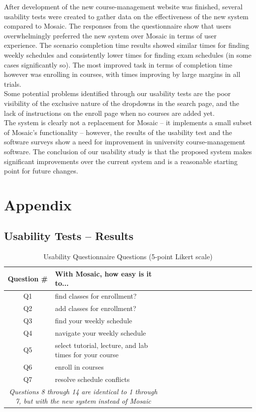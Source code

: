 \documentclass[10pt]{article}
\begin{document}
\begin{multicols}{2}
After development of the new course-management website was finished, several usability tests were created to gather data on the effectiveness of the new system compared to Mosaic. The responses from the questionnaire show that users overwhelmingly preferred the new system over Mosaic in terms of user experience. The scenario completion time results showed similar times for finding weekly schedules and consistently lower times for finding exam schedules (in some cases significantly so). The most improved task in terms of completion time however was enrolling in courses, with times improving by large margins in all trials.\\

Some potential problems identified through our usability tests are the poor visibility of the exclusive nature of the dropdowns in the search page, and the lack of instructions on the enroll page when no courses are added yet.\\

The system is clearly not a replacement for Mosaic -- it implements a small subset of Mosaic's functionality -- however, the results of the usability test and the software surveys show a need for improvement in university course-management software. The conclusion of our usability study is that the proposed system makes significant improvements over the current system and is a reasonable starting point for future changes.

\end{multicols}

\newpage
\section*{Appendix}
\subsection*{Usability Tests -- Results}
\begin{table}[h]
\centering
\caption{Usability Questionnaire Questions (5-point Likert scale)}
\begin{tabular}{cllllllllllllll}
\hline
Question \# & With Mosaic, how easy is it to...\\\hline
Q1 & find classes for enrollment?\\
Q2 & add classes for enrollment? \\
Q3 & find your weekly schedule\\
Q4 & navigate your weekly schedule\\
Q5 & select tutorial, lecture, and lab times for your course\\
Q6 & enroll in courses\\
Q7 & resolve schedule conflicts\\\hline
\multicolumn{2}{c}{\emph{Questions 8 through 14 are identical to 1 through 7, but with the new system instead of Mosaic}}\\
\hline
\end{tabular}
\end{table}
\end{document}
